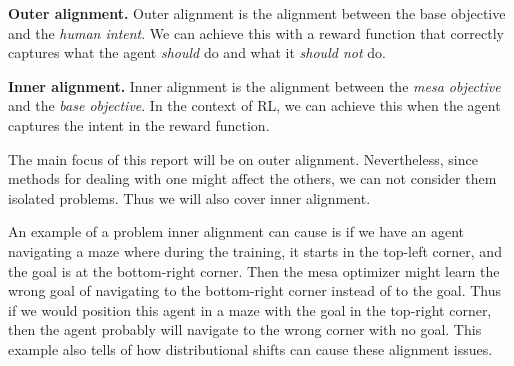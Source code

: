 \documentclass[12pt,A4]{report}
\newcommand{\autobaj}{}
\theoremstyle{definition}
\begin{document}
\begin{displayquote} 
\textbf{Outer alignment.} 
  Outer alignment is the alignment between the base objective and the \textit{human intent}. We can achieve this with a reward function that correctly captures what the agent \textit{should} do and what it \textit{should not} do.
\end{displayquote} 

\begin{displayquote} 
  \textbf{Inner alignment.} 
Inner alignment is the alignment between the \textit{mesa objective} and the \textit{base objective}. In the context of RL, we can achieve this when the agent captures the intent in the reward function.
\end{displayquote} 

The main focus of this report will be on outer alignment. Nevertheless, since methods for dealing with one might affect the others, we can not consider them isolated problems. Thus we will also cover inner alignment.

An example of a problem inner alignment can cause is if we have an agent navigating a maze where during the training, it starts in the top-left corner, and the goal is at the bottom-right corner. Then the mesa optimizer might learn the wrong goal of navigating to the bottom-right corner instead of to the goal. Thus if we would position this agent in a maze with the goal in the top-right corner, then the agent probably will navigate to the wrong corner with no goal. This example also tells of how distributional shifts can cause these alignment issues. 





\end{document}
